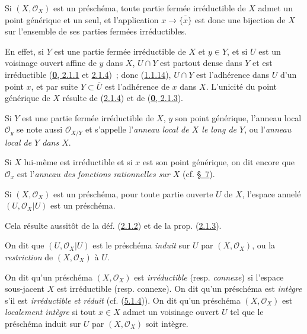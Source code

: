 \begin{proposition}[2.1.5]
\label{I.2.1.5-fr}
Si $(X,\mathscr{O}_X)$ est un préschéma, toute partie fermée irréductible de
$X$ admet un point générique et un seul, et l'application
$x\to\overline{\{x\}}$ est donc une bijection de $X$ sur l'ensemble
de ses parties fermées irréductibles.
\end{proposition}

En effet, si $Y$ est une partie fermée irréductible de $X$ et $y\in Y$, et si
$U$ est un voisinage ouvert affine de $y$ dans $X$, $U\cap Y$ est partout
dense dans $Y$ et est irréductible
(\hyperref[0.2.1.1-fr]{\textbf{0}, 2.1.1} et
\hyperref[0.2.1.4-fr]{2.1.4})~; donc
(\hyperref[I.1.1.14-fr]{1.1.14}), $U\cap Y$ est l'adhérence dans $U$ d'un
point $x$, et par suite $Y\subset\overline{U}$ est l'adhérence de $x$ dans
$X$. L'unicité du point générique de $X$ résulte de
(\hyperref[I.2.1.4-fr]{2.1.4}) et de
(\hyperref[0.2.1.3-fr]{\textbf{0}, 2.1.3}).

\begin{env}[2.1.6]
\label{I.2.1.6-fr}
Si $Y$ est une partie fermée irréductible de $X$, $y$ son point générique,
l'anneau local $\mathscr{O}_y$ se note aussi $\mathscr{O}_{X/Y}$ et s'appelle
l'\emph{anneau local de $X$ le long de $Y$}, ou l'\emph{anneau local de $Y$
dans $X$}.

Si $X$ lui-même est irréductible et si $x$ est son point générique, on dit
encore que $\mathscr{O}_x$ est l'\emph{anneau des fonctions rationnelles sur
$X$} (cf. \hyperref[section:I.7-fr]{§~7}).
\end{env}

\begin{proposition}[2.1.7]
\label{I.2.1.7-fr}
Si $(X,\mathscr{O}_X)$ est un préschéma, pour toute partie ouverte $U$ de $X$,
l'espace annelé $(U,\mathscr{O}_X|U)$ est un préschéma.
\end{proposition}

Cela résulte aussitôt de la déf. (\hyperref[I.2.1.2-fr]{2.1.2}) et de la prop.
(\hyperref[I.2.1.3-fr]{2.1.3}).

On dit que $(U,\mathscr{O}_X|U)$ est le préschéma \emph{induit} sur $U$ par
$(X,\mathscr{O}_X)$, ou la \emph{restriction} de $(X,\mathscr{O}_X)$ à $U$.

\begin{env}[2.1.8]
\label{I.2.1.8-fr}
On dit qu'un préschéma $(X,\mathscr{O}_X)$ est \emph{irréductible} (resp.
\emph{connexe}) si l'espace sous-jacent $X$ est irréductible (resp. connexe).
On dit qu'un préschéma est \emph{intègre} s'il est \emph{irréductible et
réduit} (cf. (\hyperref[I.5.1.4-fr]{5.1.4})). On dit qu'un préschéma
$(X,\mathscr{O}_X)$ est \emph{localement intègre} si tout $x\in X$ admet un
voisinage ouvert $U$ tel que le préschéma induit sur $U$ par
$(X,\mathscr{O}_X)$ soit intègre.
\end{env}

